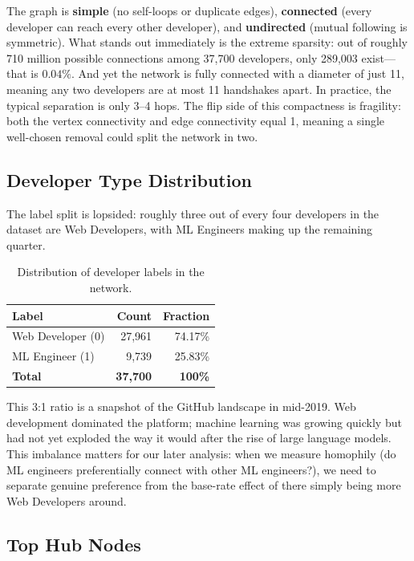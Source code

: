 \documentclass[letterpaper]{article}
\begin{document}
The graph is \textbf{simple} (no self-loops or duplicate edges), \textbf{connected} (every developer can reach every other developer), and \textbf{undirected} (mutual following is symmetric). What stands out immediately is the extreme sparsity: out of roughly 710 million possible connections among 37,700 developers, only 289,003 exist---that is $0.04\%$. And yet the network is fully connected with a diameter of just 11, meaning any two developers are at most 11 handshakes apart. In practice, the typical separation is only 3--4 hops. The flip side of this compactness is fragility: both the vertex connectivity and edge connectivity equal 1, meaning a single well-chosen removal could split the network in two.

\subsection{Developer Type Distribution}

The label split is lopsided: roughly three out of every four developers in the dataset are Web Developers, with ML Engineers making up the remaining quarter.

\begin{table}[H]
  \centering
  \begin{tabular}{lrr}
    \toprule
    \textbf{Label} & \textbf{Count} & \textbf{Fraction} \\
    \midrule
    Web Developer (0)     & 27,961 & 74.17\% \\
    ML Engineer (1)       & 9,739  & 25.83\% \\
    \midrule
    \textbf{Total}        & \textbf{37,700} & \textbf{100\%} \\
    \bottomrule
  \end{tabular}
  \caption{Distribution of developer labels in the network.}
  \label{tab:label_dist}
\end{table}

This 3:1 ratio is a snapshot of the GitHub landscape in mid-2019. Web development dominated the platform; machine learning was growing quickly but had not yet exploded the way it would after the rise of large language models. This imbalance matters for our later analysis: when we measure homophily (do ML engineers preferentially connect with other ML engineers?), we need to separate genuine preference from the base-rate effect of there simply being more Web Developers around.

\subsection{Top Hub Nodes}
\end{document}
